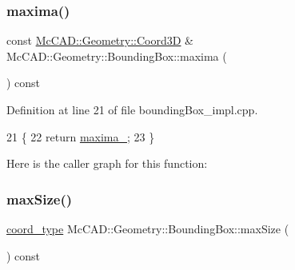 \subsubsection{\texorpdfstring{maxima()}{maxima()}\hspace{0.1cm}{\footnotesize\ttfamily [2/2]}}
{\footnotesize\ttfamily const \hyperlink{classMcCAD_1_1Geometry_1_1Coord3D}{Mc\+C\+A\+D\+::\+Geometry\+::\+Coord3D} \& Mc\+C\+A\+D\+::\+Geometry\+::\+Bounding\+Box\+::maxima (\begin{DoxyParamCaption}{ }\end{DoxyParamCaption}) const}



Definition at line 21 of file bounding\+Box\+\_\+impl.\+cpp.


\begin{DoxyCode}
21                                       \{
22     \textcolor{keywordflow}{return} \hyperlink{classMcCAD_1_1Geometry_1_1BoundingBox_aa69d74a92caca3795ecd4089c3f71a87}{maxima\_};
23 \}
\end{DoxyCode}
Here is the caller graph for this function\+:
\mbox{\label{classMcCAD_1_1Geometry_1_1BoundingBox_a27a008c7c82c9fdc8489e9c877a744a8}} 
\subsubsection{\texorpdfstring{max\+Size()}{maxSize()}\hspace{0.1cm}{\footnotesize\ttfamily [1/2]}}
{\footnotesize\ttfamily \hyperlink{namespaceMcCAD_1_1Geometry_ac043b37a4a7e849fca22869e1982d2f8}{coord\+\_\+type} Mc\+C\+A\+D\+::\+Geometry\+::\+Bounding\+Box\+::max\+Size (\begin{DoxyParamCaption}{ }\end{DoxyParamCaption}) const}

\mbox{\label{classMcCAD_1_1Geometry_1_1BoundingBox_a04ff6e5333ef4eabf48ab7db149caeea}} 
